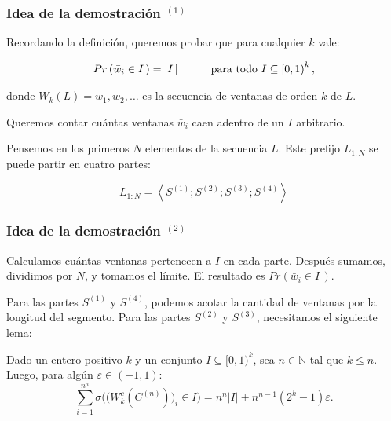 \documentclass[t, 10pt, mathserif]{beamer}
\begin{document}
\begin{frame}
  \frametitle{Idea de la demostración {$^{(1)}$}}

  Recordando la definición, queremos probar que para cualquier $k$ vale:

  \vspace{-0.5cm}
  \begin{equation*}
    \begin{aligned}
      Pr \left( \bar{w}_i \in I\, \right) = \left| I\, \right| \hspace*{1cm} \text{para todo } I \subseteq \left[0, 1\right)^k \text{,}
    \end{aligned}
  \end{equation*}
  
  donde $W_k(L) = \bar{w}_1, \bar{w}_2, \dots$ es la secuencia de ventanas de orden $k$ de $L$.
  \pause

  Queremos contar cuántas ventanas $\bar{w}_i$ caen adentro de un $I$ arbitrario.
  \pause

  Pensemos en los primeros $N$ elementos de la secuencia $L$. Este prefijo $L_{1:N}$ se puede partir en cuatro partes:
  \pause

  \begin{equation*}
    L_{1:N} = \left< S^{(1)} ; S^{(2)} ; S^{(3)} ; S^{(4)} \right>
  \end{equation*}
  
\end{frame}


\begin{frame}
  \frametitle{Idea de la demostración {$^{(2)}$}}

  Calculamos cuántas ventanas pertenecen a $I$ en cada parte. Después sumamos, dividimos por $N$, y tomamos el límite. El resultado es $Pr \left( \bar{w}_i \in I\, \right)$.
  \pause

  Para las partes $S^{(1)}$ y $S^{(4)}$, podemos acotar la cantidad de ventanas por la longitud del segmento. Para las partes $S^{(2)}$ y $S^{(3)}$, necesitamos el siguiente lema:
  \pause

  \begin{lemma}
    \medskip
    Dado un entero positivo $k$ y un conjunto $I \subseteq [0, 1)^k$, sea $n \in \mathbb{N}$ tal que $k \le n$. Luego, para algún $\varepsilon \in (-1, 1)$:
    \begin{equation*}
      \sum_{i = 1}^{n^n} \sigma\Big( \big( W_k^{c}(C^{(n)}) \big)_i \in I \Big) = n^n |I| + n^{n - 1} (2^k - 1) \varepsilon \text{.}
    \end{equation*}
  \end{lemma}

\end{frame}
\end{document}
